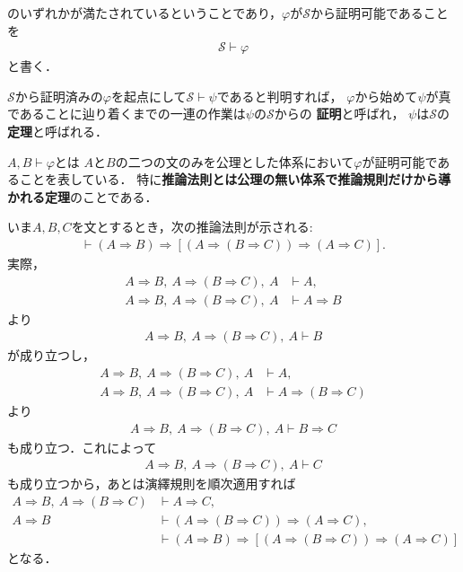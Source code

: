 	のいずれかが満たされているということであり，$\varphi$が$\mathscr{S}$から証明可能であることを
	\begin{align}
		\mathscr{S} \vdash \varphi
	\end{align}
	と書く．
	
	$\mathscr{S}$から証明済みの$\varphi$を起点にして$\mathscr{S} \vdash \psi$であると判明すれば，
	$\varphi$から始めて$\psi$が真であることに辿り着くまでの一連の作業は$\psi$の$\mathscr{S}$からの
	{\bf 証明}と呼ばれ，
	$\psi$は$\mathscr{S}$の{\bf 定理}と呼ばれる．
	
	$A,B \vdash \varphi$とは
	$A$と$B$の二つの文のみを公理とした体系において$\varphi$が証明可能であることを表している．
	特に{\bf 推論法則とは公理の無い体系で推論規則だけから導かれる定理}のことである．
	
	いま$A,B,C$を文とするとき，次の推論法則が示される:
	\begin{align}
		\vdash (A \Longrightarrow B) \Longrightarrow [(A \Longrightarrow (
		B \Longrightarrow C)) \Longrightarrow (A \Longrightarrow C)].
		\label{lemma_for_the_deduction_theorem}
	\end{align}
	実際，
	\begin{align}
		A \Longrightarrow B,\ A \Longrightarrow (B \Longrightarrow C),\ A
		&\vdash A, \\
		A \Longrightarrow B,\ A \Longrightarrow (B \Longrightarrow C),\ A
		&\vdash A \Longrightarrow B
	\end{align}
	より
	\begin{align}
		A \Longrightarrow B,\ A \Longrightarrow (B \Longrightarrow C),\ A
		\vdash B
	\end{align}
	が成り立つし，
	\begin{align}
		A \Longrightarrow B,\ A \Longrightarrow (B \Longrightarrow C),\ A
		&\vdash A, \\
		A \Longrightarrow B,\ A \Longrightarrow (B \Longrightarrow C),\ A
		&\vdash A \Longrightarrow (B \Longrightarrow C)
	\end{align}
	より
	\begin{align}
		A \Longrightarrow B,\ A \Longrightarrow (B \Longrightarrow C),\ A
		\vdash B \Longrightarrow C
	\end{align}
	も成り立つ．これによって
	\begin{align}
		A \Longrightarrow B,\ A \Longrightarrow (B \Longrightarrow C),\ A
		\vdash C
	\end{align}
	も成り立つから，あとは演繹規則を順次適用すれば
	\begin{align}
		A \Longrightarrow B,\ A \Longrightarrow (B \Longrightarrow C)
		&\vdash A \Longrightarrow C, \\
		A \Longrightarrow B
		&\vdash (A \Longrightarrow (B \Longrightarrow C)) \Longrightarrow
		(A \Longrightarrow C), \\
		&\vdash (A \Longrightarrow B) \Longrightarrow [(A \Longrightarrow (
		B \Longrightarrow C)) \Longrightarrow (A \Longrightarrow C)]
	\end{align}
	となる．
	
